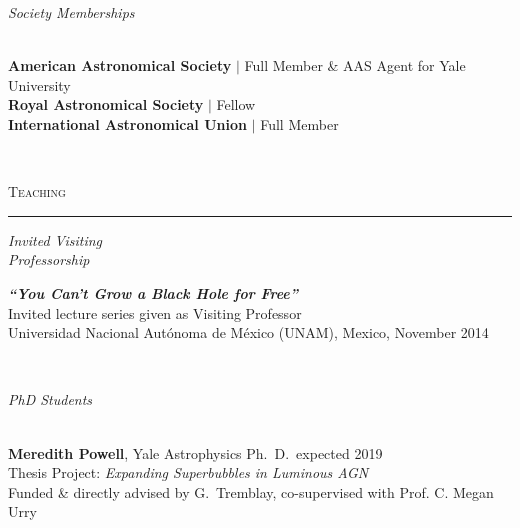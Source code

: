 \documentclass[11pt]{article}
\makeatletter
\def\vhrulefill#1{\leavevmode\leaders\hrule\@height#1\hfill \kern\z@}
\makeatother
\begin{document}
\hspace{2.5mm} \parbox{1.5in}{\textit{Society Memberships \\\\}} \parbox{5.15in}{ \textbf{American Astronomical Society} $|$ Full Member \& AAS Agent for Yale University \\ \textbf{Royal Astronomical Society} $|$ Fellow \\ \textbf{International Astronomical Union} $|$ Full Member}\\




\vspace{4mm}


\textsc{Teaching} \vhrulefill{0.4pt}


\vspace{6mm}


\hspace{2.5mm} \parbox{1.5in}{\textit{Invited Visiting \\ Professorship \\ }} \parbox{5.15in}{ \textit{\textbf{``You Can't Grow a Black Hole for Free''}}\\ Invited lecture series given as Visiting Professor \\ Universidad Nacional Aut\'{o}noma de M\'{e}xico (UNAM), Mexico, November 2014}\\

\vspace{4mm}


\hspace{2.5mm} \parbox{1.5in}{\textit{PhD Students \\\\}} \parbox{5.15in}{
\textbf{Meredith Powell}, Yale Astrophysics Ph.~D.~expected 2019\\ Thesis Project: \textit{Expanding Superbubbles in Luminous AGN}\\
Funded \& directly advised by G.~Tremblay,
co-supervised with Prof. C. Megan Urry
}\\



\vspace{4mm}
\end{document}
